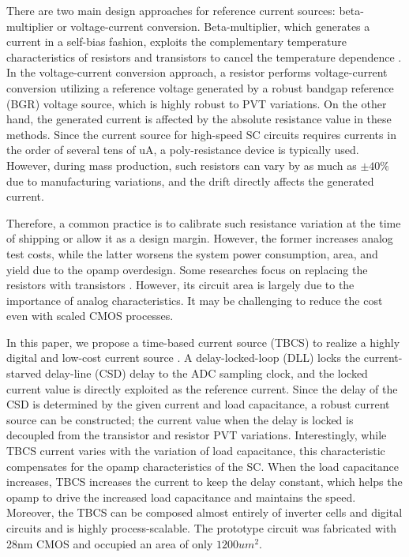 \documentclass[letterpaper, 10 pt, conference]{ieeeconf}  %
\begin{document}
There are two main design approaches for reference current sources: beta-multiplier or voltage-current conversion. Beta-multiplier, which generates a current in a self-bias fashion, exploits the complementary temperature characteristics of resistors and transistors to cancel the temperature dependence \cite{azcona2014precision, osipov2016temperature}. In the voltage-current conversion approach, a resistor performs voltage-current conversion utilizing a reference voltage generated by a robust bandgap reference (BGR) voltage source, which is highly robust to PVT variations\cite{banba1999cmos, ueno2009300, ueno20101}. On the other hand, the generated current is affected by the absolute resistance value in these methods. Since the current source for high-speed SC circuits requires currents in the order of several tens of uA, a poly-resistance device is typically used. However, during mass production, such resistors can vary by as much as $\pm40\%$ due to manufacturing variations, and the drift directly affects the generated current.

Therefore, a common practice is to calibrate such resistance variation at the time of shipping or allow it as a design margin. However, the former increases analog test costs, while the latter worsens the system power consumption, area, and yield due to the opamp overdesign. Some researches focus on replacing the resistors with transistors \cite{hirose2010nano, hirose2010cmos, osaki20131, choi201423pw}. However, its circuit area is largely due to the importance of analog characteristics. It may be challenging to reduce the cost even with scaled CMOS processes.

In this paper, we propose a time-based current source (TBCS) to realize a highly digital and low-cost current source \cite{yoshioka201728}. A delay-locked-loop (DLL) locks the current-starved delay-line (CSD) delay to the ADC sampling clock, and the locked current value is directly exploited as the reference current. 
Since the delay of the CSD is determined by the given current and load capacitance, a robust current source can be constructed; the current value when the delay is locked is decoupled from the transistor and resistor PVT variations.
Interestingly, while TBCS current varies with the variation of load capacitance, this characteristic compensates for the opamp characteristics of the SC. 
When the load capacitance increases, TBCS increases the current to keep the delay constant, which helps the opamp to drive the increased load capacitance and maintains the speed.
Moreover, the TBCS can be composed almost entirely of inverter cells and digital circuits and is highly process-scalable. The prototype circuit was fabricated with 28nm CMOS and occupied an area of only $1200um^2$.
\end{document}

